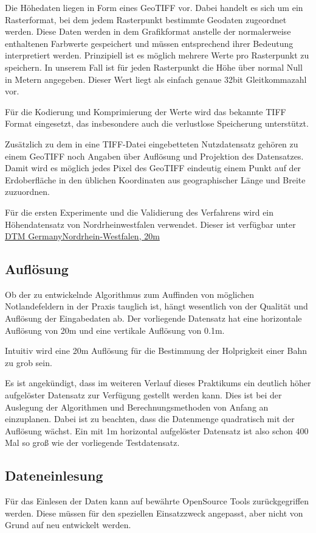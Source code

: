 \documentclass[
11pt, %
a4paper, %
oneside, %
pdfspacing, %
headinclude,
BCOR5mm, %
ngerman, %
bibtotocnumbered,
]{scrartcl}
\begin{document}
Die Höhedaten liegen in Form eines GeoTIFF vor. Dabei handelt es sich um ein Rasterformat, bei dem jedem Rasterpunkt bestimmte Geodaten zugeordnet werden. Diese Daten werden in dem Grafikformat anstelle der normalerweise enthaltenen Farbwerte gespeichert und müssen entsprechend ihrer Bedeutung interpretiert werden. Prinzipiell ist es möglich mehrere Werte pro Rasterpunkt zu speichern. In unserem Fall ist für jeden Rasterpunkt die Höhe über normal Null in Metern angegeben. Dieser Wert liegt als einfach genaue 32bit Gleitkommazahl vor.

Für die Kodierung und Komprimierung der Werte wird das bekannte TIFF Format eingesetzt, das insbesondere auch die verlustlose Speicherung unterstützt.

Zusätzlich zu dem in eine TIFF-Datei eingebetteten Nutzdatensatz gehören zu einem GeoTIFF noch Angaben über Auflösung und Projektion des Datensatzes. Damit wird es möglich jedes Pixel des GeoTIFF eindeutig einem Punkt auf der Erdoberfläche in den üblichen Koordinaten aus geographischer Länge und Breite zuzuordnen.

Für die ersten Experimente und die Validierung des Verfahrens wird ein Höhendatensatz von Nordrheinwestfalen verwendet. Dieser ist verfügbar unter \href{http://data.opendataportal.at/dataset/dtm-germany/resource/08d8c183-a4cc-4a7b-84a0-d03f92076ed3}{DTM Germany\textunderscore Nordrhein-Westfalen, 20m}


	\subsection{Auflösung}
	Ob der zu entwickelnde Algorithmus zum Auffinden von möglichen Notlandefeldern in der Praxis tauglich ist, hängt wesentlich von der Qualität und Auflösung der Eingabedaten ab. Der vorliegende Datensatz hat eine horizontale Auflösung von 20m und eine vertikale Auflösung von 0.1m. 
	
	Intuitiv wird eine 20m Auflösung für die Bestimmung der Holprigkeit einer Bahn zu grob sein. 
	
	Es ist angekündigt, dass im weiteren Verlauf dieses Praktikums ein deutlich höher aufgelöster Datensatz zur Verfügung gestellt werden kann. Dies ist bei der Auslegung der Algorithmen und Berechnungsmethoden von Anfang an einzuplanen. Dabei ist zu beachten, dass die Datenmenge quadratisch mit der Auflösung wächst. Ein mit 1m horizontal aufgelöster Datensatz ist also schon 400 Mal so groß wie der vorliegende Testdatensatz.
	
	\subsection{Dateneinlesung}
	Für das Einlesen der Daten kann auf bewährte OpenSource Tools zurückgegriffen werden. Diese müssen für den speziellen Einsatzzweck angepasst, aber nicht von Grund auf neu entwickelt werden.
	
\end{document}

